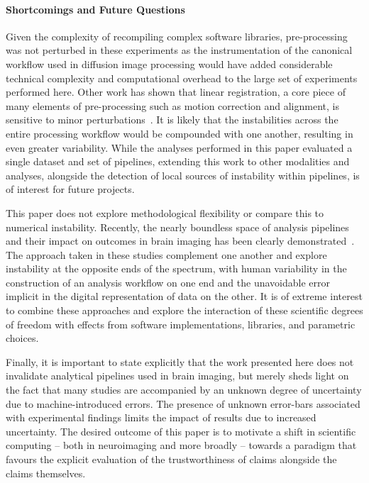 \documentclass[fleqn,10pt]{SelfArx} %
\newcommand{\new}[1]{{#1}}
\begin{document}
\paragraph{Shortcomings and Future Questions}
Given the complexity of recompiling complex software libraries, pre-processing was not perturbed in these experiments
\new{as the instrumentation of the canonical workflow used in diffusion image processing would have added considerable
technical complexity and computational overhead to the large set of experiments performed here}.
Other work has shown that linear registration, a core piece of many elements of pre-processing such as motion
correction and alignment, is sensitive to minor perturbations~\cite{Glatard2015-vc}. It is likely that the
instabilities across the entire processing workflow would be compounded with one another, resulting in even greater
variability. While the analyses performed in this paper evaluated a single dataset and set of pipelines, extending this
work to other modalities and analyses, \new{alongside the detection of local sources of instability within pipelines},
is of interest for future projects.

This paper does not explore methodological flexibility or compare this to numerical instability. Recently, the nearly
boundless space of analysis pipelines and their impact on outcomes in brain imaging has been clearly
demonstrated~\cite{botvinik2020variability}. The approach taken in these studies complement one another and explore
instability at the opposite ends of the spectrum, with human variability in the construction of an analysis workflow on
one end and the unavoidable error implicit in the digital representation of data on the other. It is of extreme
interest to combine these approaches and explore the interaction of these scientific degrees of freedom with effects
from software implementations, libraries, and parametric choices.

Finally, it is important to state explicitly that the work presented here does not invalidate analytical pipelines used
in brain imaging, but merely sheds light on the fact that many studies are accompanied by an unknown degree of
uncertainty due to machine-introduced errors. The presence of unknown error-bars associated with experimental findings
limits the impact of results due to increased uncertainty. The desired outcome of this paper is to motivate a shift in
scientific computing – both in neuroimaging and more broadly – towards a paradigm \new{that} favours the explicit evaluation
of the trustworthiness of claims alongside the claims themselves.
\end{document}
